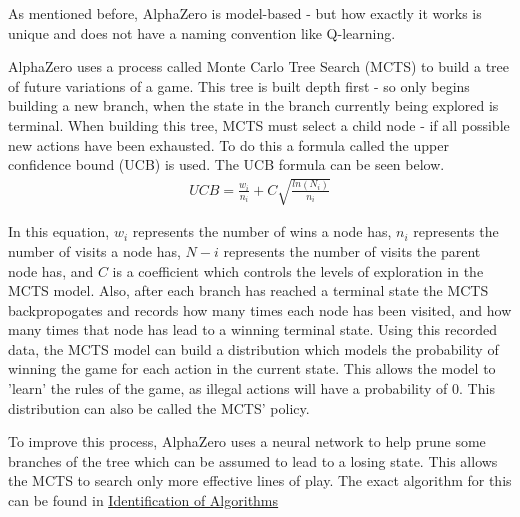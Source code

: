 \documentclass{article}
\makeatletter
\newcommand\subsubsubsection{\@startsection{paragraph}{4}{\z@}{-2.5ex\@plus -1ex \@minus -.25ex}{1.25ex \@plus .25ex}{\normalfont\normalsize\bfseries}}
\newcommand{\myhy}[2]{\hyperref[#1]{\color{black}\setulcolor{black}\ul{#2}}}
\makeatother
\begin{document}
    \subsubsubsection{AlphaZero}
    As mentioned before, AlphaZero is model-based - but how exactly it works is unique and does not have a naming convention like Q-learning.

    AlphaZero uses a process called Monte Carlo Tree Search (MCTS) to build a tree of future variations of a game. This tree is built depth first - so only begins building a new branch, when the state in the
    branch currently being explored is terminal. When building this tree, MCTS must select a child node - if all possible new actions have been exhausted. To do this a formula called the upper confidence 
    bound (UCB) is used. The UCB formula can be seen below.
    \begin{align}
        UCB = \frac{w_i}{n_i} + C\sqrt{\frac{ln(N_i)}{n_i}}
    \end{align}
    
    In this equation, $w_i$ represents the number of wins a node has, $n_i$ represents the number of visits a node has, $N-i$ represents the number of visits the parent node has, and $C$ is a coefficient which
    controls the levels of exploration in the MCTS model.
    Also, after each branch has reached a terminal state the MCTS backpropogates and records how many times each node has been visited, and how many times that node has lead to a winning terminal state. 
    Using this recorded data, the MCTS model can build a distribution which models the probability of winning the game for each action in the current state. This allows the model to 'learn' the rules
    of the game, as illegal actions will have a probability of 0. This distribution can also be called the MCTS' policy.

    To improve this process, AlphaZero uses a neural network to help prune some branches of the tree which can be assumed to lead to a losing state. This allows the MCTS to search only more effective
    lines of play. The exact algorithm for this can be found in \myhy{sec:IDoA}{Identification of Algorithms}
    
\end{document}
